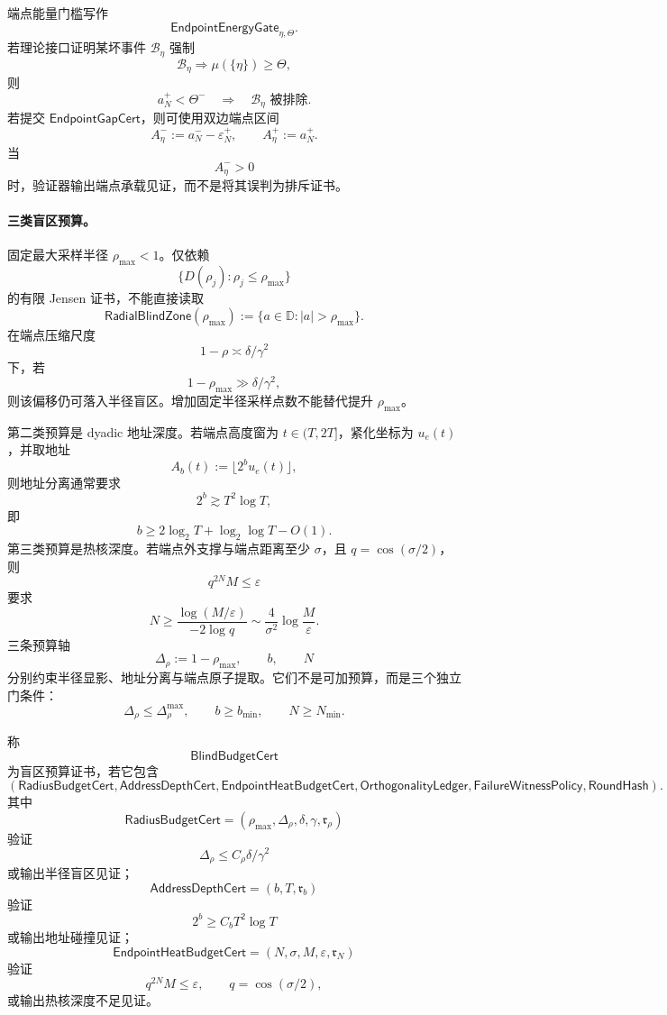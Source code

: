 端点能量门槛写作
\[
\mathsf{EndpointEnergyGate}_{\eta,\Theta}.
\]
若理论接口证明某坏事件 \(\mathcal B_\eta\) 强制
\[
\mathcal B_\eta
\Longrightarrow
\mu(\{\eta\})\ge\Theta,
\]
则
\[
a_N^+<\Theta^-
\quad\Longrightarrow\quad
\mathcal B_\eta\text{ 被排除}.
\]
若提交 \(\mathsf{EndpointGapCert}\)，则可使用双边端点区间
\[
A_\eta^-:=a_N^- - \varepsilon_N^+,
\qquad
A_\eta^+:=a_N^+.
\]
当
\[
A_\eta^->0
\]
时，验证器输出端点承载见证，而不是将其误判为排斥证书。

\paragraph{三类盲区预算。}
固定最大采样半径 \(\rho_{\max}<1\)。仅依赖
\[
\{D(\rho_j):\rho_j\le\rho_{\max}\}
\]
的有限 Jensen 证书，不能直接读取
\[
\mathsf{RadialBlindZone}(\rho_{\max})
:=
\{a\in\mathbb D:|a|>\rho_{\max}\}.
\]
在端点压缩尺度
\[
1-\rho\asymp\delta/\gamma^2
\]
下，若
\[
1-\rho_{\max}\gg\delta/\gamma^2,
\]
则该偏移仍可落入半径盲区。增加固定半径采样点数不能替代提升 \(\rho_{\max}\)。

第二类预算是 dyadic 地址深度。若端点高度窗为 \(t\in(T,2T]\)，紧化坐标为 \(u_e(t)\)，并取地址
\[
A_b(t):=\lfloor2^bu_e(t)\rfloor,
\]
则地址分离通常要求
\[
2^b\gtrsim T^2\log T,
\]
即
\[
b\ge
2\log_2T+\log_2\log T-O(1).
\]
第三类预算是热核深度。若端点外支撑与端点距离至少 \(\sigma\)，且 \(q=\cos(\sigma/2)\)，则
\[
q^{2N}M\le\varepsilon
\]
要求
\[
N\ge\frac{\log(M/\varepsilon)}{-2\log q}
\sim
\frac{4}{\sigma^2}\log\frac{M}{\varepsilon}.
\]
三条预算轴
\[
\Delta_\rho:=1-\rho_{\max},
\qquad b,
\qquad N
\]
分别约束半径显影、地址分离与端点原子提取。它们不是可加预算，而是三个独立门条件：
\[
\Delta_\rho\le\Delta_\rho^{\max},
\qquad
b\ge b_{\min},
\qquad
N\ge N_{\min}.
\]

\begin{definition}[盲区预算证书]\label{def:typed-address-biaxial-completion-blind-budget-cert}
称
\[
\mathsf{BlindBudgetCert}
\]
为盲区预算证书，若它包含
\[
\left(
\mathsf{RadiusBudgetCert},
\mathsf{AddressDepthCert},
\mathsf{EndpointHeatBudgetCert},
\mathsf{OrthogonalityLedger},
\mathsf{FailureWitnessPolicy},
\mathsf{RoundHash}
\right).
\]
其中
\[
\mathsf{RadiusBudgetCert}
=
(\rho_{\max},\Delta_\rho,\delta,\gamma,\mathfrak r_\rho)
\]
验证
\[
\Delta_\rho\le C_\rho\delta/\gamma^2
\]
或输出半径盲区见证；
\[
\mathsf{AddressDepthCert}
=
(b,T,\mathfrak r_b)
\]
验证
\[
2^b\ge C_bT^2\log T
\]
或输出地址碰撞见证；
\[
\mathsf{EndpointHeatBudgetCert}
=
(N,\sigma,M,\varepsilon,\mathfrak r_N)
\]
验证
\[
q^{2N}M\le\varepsilon,
\qquad q=\cos(\sigma/2),
\]
或输出热核深度不足见证。
\end{definition}

